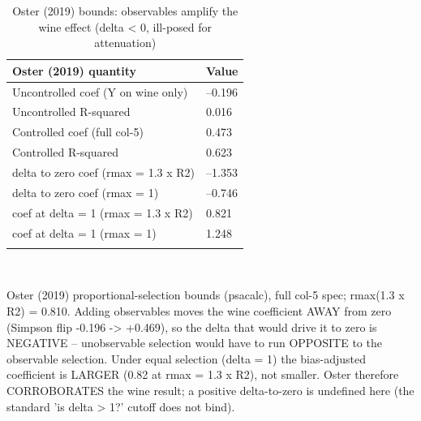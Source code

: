 \begin{table}[tbp] \centering
{}

\caption{Oster (2019) bounds: observables amplify the wine effect (delta < 0, ill-posed for attenuation)}
\label{tab:T_oster}
\begin{tabularx}{\linewidth}{@{}lC@{}}

\toprule
{Oster (2019) quantity}&{Value} \tabularnewline
\midrule \addlinespace[\belowrulesep]
Uncontrolled coef (Y on wine only)&--0.196 \tabularnewline
Uncontrolled R-squared&0.016 \tabularnewline
Controlled coef (full col-5)&0.473 \tabularnewline
Controlled R-squared&0.623 \tabularnewline
delta to zero coef (rmax = 1.3 x R2)&--1.353 \tabularnewline
delta to zero coef (rmax = 1)&--0.746 \tabularnewline
coef at delta = 1 (rmax = 1.3 x R2)&0.821 \tabularnewline
coef at delta = 1 (rmax = 1)&1.248 \tabularnewline
\bottomrule \addlinespace[\belowrulesep]

\end{tabularx}
\\ \parbox{\linewidth}{\footnotesize Oster (2019) proportional-selection bounds (psacalc), full col-5 spec; rmax(1.3 x R2) = 0.810. Adding observables moves the wine coefficient AWAY from zero (Simpson flip -0.196 -> +0.469), so the delta that would drive it to zero is NEGATIVE -- unobservable selection would have to run OPPOSITE to the observable selection. Under equal selection (delta = 1) the bias-adjusted coefficient is LARGER (0.82 at rmax = 1.3 x R2), not smaller. Oster therefore CORROBORATES the wine result; a positive delta-to-zero is undefined here (the standard 'is delta > 1?' cutoff does not bind).}
\end{table}
